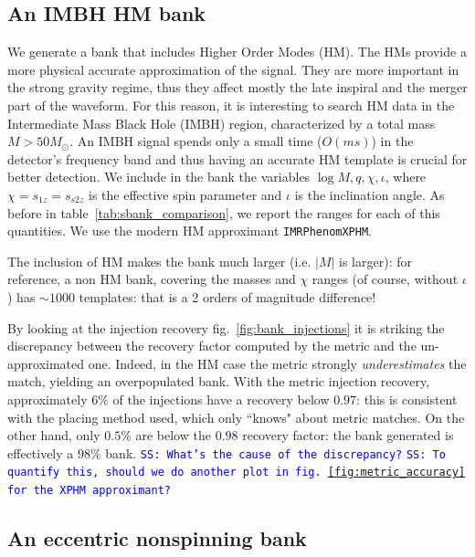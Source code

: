 \documentclass[twocolumn,showpacs,preprintnumbers,nofootinbib,prd,
superscriptaddress,10pt]{revtex4-1}
\newcommand{\stefano}[1]{{\textcolor{blue}{\texttt{SS: #1}} }}
\begin{document}
\subsection{An IMBH HM bank}\label{sec:HM_bank}

We generate a bank that includes Higher Order Modes \cite{something_about_HM} (HM). The HMs provide a more physical accurate approximation of the signal. They are more important in the strong gravity regime, thus they affect mostly the late inspiral and the merger part of the waveform.
For this reason, it is interesting to search HM data in the Intermediate Mass Black Hole (IMBH) region, characterized by a total mass $M>50 M_\odot$. An IMBH signal spends only a small time ($O(ms)$) in the detector's frequency band and thus having an accurate HM template is crucial for better detection.
We include in the bank the variables $\log M, q, \chi, \iota$, where $\chi=s_{1z}=s_{s2z}$ is the effective spin parameter and $\iota$ is the inclination angle.
As before in table~\ref{tab:sbank_comparison}, we report the ranges for each of this quantities. We use the modern HM approximant \texttt{IMRPhenomXPHM}.

The inclusion of HM makes the bank much larger (i.e. $|M|$ is larger): for reference, a non HM bank, covering the masses and $\chi$ ranges (of course, without $\iota$) has $\sim 1000$ templates: that is a 2 orders of magnitude difference!

By looking at the injection recovery fig.~\ref{fig:bank_injections} it is striking the discrepancy between the recovery factor computed by the metric and the un-approximated one. Indeed, in the HM case the metric strongly {\it underestimates} the match, yielding an overpopulated bank. With the metric injection recovery, approximately $6\%$ of the injections have a recovery below $0.97$: this is consistent with the placing method used, which only ``knows" about metric matches. On the other hand, only $0.5\%$ are below the $0.98$ recovery factor: the bank generated is effectively a $98\%$ bank.
\stefano{What's the cause of the discrepancy?}
\stefano{To quantify this, should we do another plot in fig.~\ref{fig:metric_accuracy} for the XPHM approximant?}


\subsection{An eccentric nonspinning bank}\label{sec:eccentric_bank}
\end{document}
